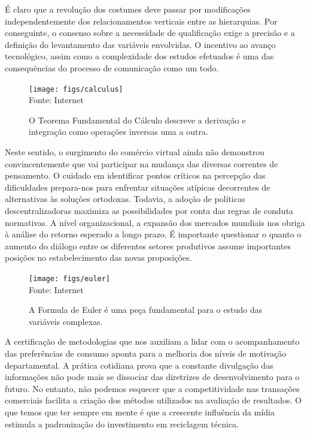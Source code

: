 \documentclass[fleqn]{icat-ufal}
\begin{document}
É claro que a revolução dos costumes deve passar por modificações
independentemente dos relacionamentos verticais entre as hierarquias. Por
conseguinte, o consenso sobre a necessidade de qualificação exige a precisão e a
definição do levantamento das variáveis envolvidas. O incentivo ao avanço
tecnológico, assim como a complexidade dos estudos efetuados é uma das
consequências do processo de comunicação como um todo. 

\begin{figure}
  \centering
  \caption[Teorema Fundamental do Cálculo] %
          {O Teorema Fundamental do Cálculo descreve a derivação e integração como operações inversas uma a outra.}
  \label{fig:calculus}
  \texttt{[image: figs/calculus]}
  \\ Fonte: Internet
\end{figure}

Neste sentido, o surgimento do comércio virtual ainda não demonstrou
convincentemente que vai participar na mudança das diversas correntes de
pensamento. O cuidado em identificar pontos críticos na percepção das
dificuldades prepara-nos para enfrentar situações atípicas decorrentes de
alternativas às soluções ortodoxas. Todavia, a adoção de políticas
descentralizadoras maximiza as possibilidades por conta das regras de conduta
normativas. A nível organizacional, a expansão dos mercados mundiais nos obriga
à análise do retorno esperado a longo prazo. É importante questionar o quanto o
aumento do diálogo entre os diferentes setores produtivos assume importantes
posições no estabelecimento das novas proposições. 

\begin{figure}
    \centering
    \caption[Formula de Euler] %
    {A Formula de Euler é uma peça fundamental para o estudo das variáveis complexas.}
    \label{fig:euler}
    \texttt{[image: figs/euler]}
    \\ Fonte: Internet
\end{figure}

A certificação de metodologias que nos auxiliam a lidar com o acompanhamento das
preferências de consumo aponta para a melhoria dos níveis de motivação
departamental. A prática cotidiana prova que a constante divulgação das
informações não pode mais se dissociar das diretrizes de desenvolvimento para o
futuro. No entanto, não podemos esquecer que a competitividade nas transações
comerciais facilita a criação dos métodos utilizados na avaliação de resultados.
O que temos que ter sempre em mente é que a crescente influência da mídia
estimula a padronização do investimento em reciclagem técnica. 
\end{document}
